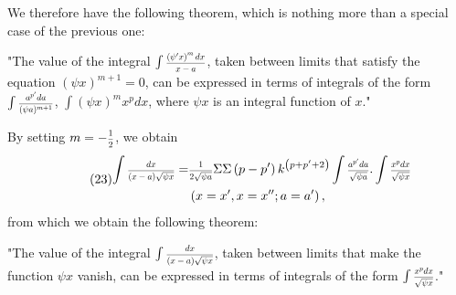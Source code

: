 \documentclass[oneside, 12 pt, leqno]{memoir}
\let\oldfrac\frac
\def\frac#1#2{\mathchoice{\text{\scalebox{.83}{${\oldfrac{#1}{#2}}$}}}{\text{\scalebox{.83}{${\displaystyle\oldfrac{#1}{#2}}$}}}{\genfrac{}{}{}{2}{#1}{#2}}{\genfrac{}{}{}{3}{#1}{#2}}}
\begin{document}
We therefore have the following theorem, which is nothing more than a special case of the previous one:

"The value of the integral \(\int \frac{\left(\psi^{\prime} x\right)^m d x}{x-a}\), taken between limits that satisfy the equation \((\psi x)^{m+1}=0\), can be expressed in terms of integrals of the form \(\int \frac{a^{p^{\prime}} d a}{(\psi a)^{m+1}}\), \(\int(\psi x)^m x^p d x\), where \(\psi x\) is an integral function of \(x\)."

By setting \(m=-\frac{1}{2}\), we obtain
\[\tag{23}\begin{aligned}
\int \frac{d x}{(x-a) \sqrt{\psi x}}= & \frac{1}{2 \sqrt{\psi a}} \Sigma \Sigma\left(p-p^{\prime}\right) k^{\left(p+p^{\prime}+2\right)} \int \frac{a^{p^{\prime}} d a}{\sqrt{\psi a}}. \int \frac{x^p d x}{\sqrt{\psi x}} \\
& \left(x=x^{\prime}, x=x^{\prime \prime} ; a=a^{\prime}\right),
\end{aligned}
\]
from which we obtain the following theorem:

"The value of the integral \(\int \frac{dx}{(x - a) \sqrt{\psi x}}\), taken between limits that make the function \(\psi x\) vanish, can be expressed in terms of integrals of the form \(\int \frac{x^p d x}{\sqrt{\psi x}}\)."
\end{document}
